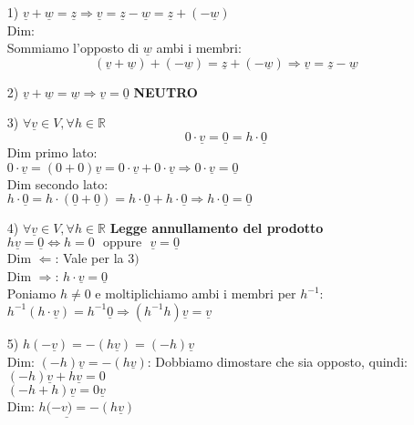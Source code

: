 \begin{itemize}
\item[1)] $ \underline{v} + \underline{w} = \underline{z} \Rightarrow \underline{v} = \underline{z} - \underline{w} = \underline{z} + (- \underline{w})$\\
Dim:\\
Sommiamo l'opposto di $\underline{w}$ ambi i membri:
$$ (\underline{v} + \underline{w}) + (- \underline{w}) = \underline{z} + (- \underline{w}) \Rightarrow \underline{v} = \underline{z} - \underline{w}$$
\item[2)] $ \underline{v} + \underline{w} = \underline{w} \Rightarrow \underline{v} = \underline{0}$ \textbf{NEUTRO}
\item[3)] $ \forall \underline{v} \in V, \forall h \in \mathbb{R} $ \\
$$ 0 \cdot \underline{v} = \underline{0} = h \cdot \underline{0} $$
Dim primo lato:\\
$ 0 \cdot \underline{v} = (0+0) \underline{v} = 0 \cdot \underline{v} + 0 \cdot \underline{v} \Rightarrow 0 \cdot \underline{v} = \underline{0} $\\
Dim secondo lato:\\
$ h \cdot \underline{0} = h \cdot (\underline{0} + \underline{0}) = h \cdot \underline{0} + h \cdot \underline{0} \Rightarrow h \cdot \underline{0} = \underline{0} $
\item[4)]$ \forall \underline{v} \in V, \forall h \in \mathbb{R} $ \textbf{Legge annullamento del prodotto}\\
$ h\underline{v} = \underline{0} \Leftrightarrow h=0 \:\:\: \text{oppure} \:\:\: \underline{v} = \underline{0} $ \\
Dim $\Leftarrow$: Vale per la $3)$ \\
Dim $\Rightarrow$: $ h \cdot \underline{v} = \underline{0} $\\
Poniamo $h \neq 0$ e moltiplichiamo ambi i membri per $h^{-1}$: \\
$ h^{-1}(h \cdot \underline{v}) = h^{-1} \underline{0} \Rightarrow (h^{-1} h) \underline{v} = \underline{v} $
\item[5)] $ h(-\underline{v}) = -(h \underline{v}) = (-h)\underline{v} $\\
Dim: $ (-h)\underline{v} = -(h\underline{v}) $:
Dobbiamo dimostare che sia opposto, quindi:\\ 
$ (-h)\underline{v} + h\underline{v} = 0 $\\
$ (-h+h)\underline{v} = 0 \underline{v}$\\
Dim: $ h(-\underline{v)} = -(h \underline{v}) $\\

\end{itemize}
